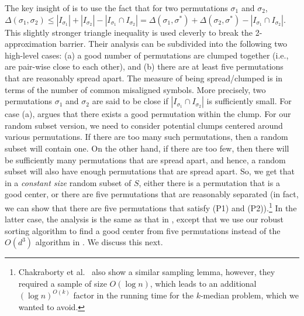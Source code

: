 \documentclass[11pt]{llncs}
\begin{document}
The key insight of \cite{cdk23} is to use the fact that for two permutations $\sigma_1$ and $\sigma_2$, $\Delta(\sigma_1, \sigma_2) \leq |I_{\sigma_1}| + |I_{\sigma_2}| - |I_{\sigma_1} \cap I_{\sigma_2}| = \Delta(\sigma_1, \sigma^*) + \Delta(\sigma_2, \sigma^*) - |I_{\sigma_1} \cap I_{\sigma_2}|$. This slightly stronger triangle inequality is used cleverly to break the 2-approximation barrier. Their analysis can be subdivided into the following two high-level cases: (a) a good number of permutations are clumped together (i.e., are pair-wise close to each other), and (b) there are at least five permutations that are reasonably spread apart. The measure of being spread/clumped is in terms of the number of common misaligned symbols. More precisely, two permutations $\sigma_1$ and $\sigma_2$ are said to be close if $|I_{\sigma_1} \cap I_{\sigma_2}|$ is sufficiently small. For case (a), \cite{cdk23} argues that there exists a good permutation within the clump. 
For our random subset version, we need to consider potential clumps centered around various permutations. If there are too many such permutations, then a random subset will contain one. On the other hand, if there are too few, then there will be sufficiently many permutations that are spread apart, and hence, a random subset will also have enough permutations that are spread apart. So, we get that in a {\em constant size} random subset of $S$, either there is a permutation that is a good center, or there are five permutations that are reasonably separated (in fact, we can show that there are five permutations that satisfy (P1) and (P2)).\footnote{Chakraborty et al.~\cite{cdk23} also show a similar sampling lemma, however, they required a sample of size $O(\log{n})$, which leads to an additional $(\log{n})^{O(k)}$ factor in the running time for the $k$-median problem, which we wanted to avoid.}
In the latter case, the analysis is the same as that in \cite{cdk23}, except that we use our robust sorting algorithm to find a good center from five permutations instead of the $O(d^3)$ algorithm in \cite{cdk23}. We discuss this next.
\end{document}

